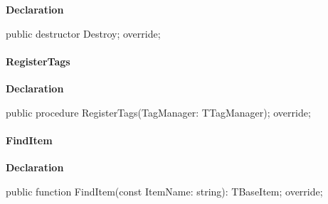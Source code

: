 \documentclass{report}
\newif\ifpdf
\begin{document}
\label{PasDoc_Items.TExternalItem-Destroy}
\begin{list}{}{
\setlength{\itemindent}{0cm}
\setlength{\listparindent}{0cm}
\setlength{\leftmargin}{\evensidemargin}
\addtolength{\leftmargin}{\tmplength}
\settowidth{\labelsep}{X}
\addtolength{\leftmargin}{\labelsep}
\setlength{\labelwidth}{\tmplength}
}
\item[\textbf{Declaration}\hfill]
\ifpdf
\begin{flushleft}
\fi
\begin{ttfamily}
public destructor Destroy; override;\end{ttfamily}

\ifpdf
\end{flushleft}
\fi

\end{list}
\paragraph*{RegisterTags}\hspace*{\fill}

\label{PasDoc_Items.TExternalItem-RegisterTags}
\begin{list}{}{
\setlength{\itemindent}{0cm}
\setlength{\listparindent}{0cm}
\setlength{\leftmargin}{\evensidemargin}
\addtolength{\leftmargin}{\tmplength}
\settowidth{\labelsep}{X}
\addtolength{\leftmargin}{\labelsep}
\setlength{\labelwidth}{\tmplength}
}
\item[\textbf{Declaration}\hfill]
\ifpdf
\begin{flushleft}
\fi
\begin{ttfamily}
public procedure RegisterTags(TagManager: TTagManager); override;\end{ttfamily}

\ifpdf
\end{flushleft}
\fi

\end{list}
\paragraph*{FindItem}\hspace*{\fill}

\label{PasDoc_Items.TExternalItem-FindItem}
\begin{list}{}{
\setlength{\itemindent}{0cm}
\setlength{\listparindent}{0cm}
\setlength{\leftmargin}{\evensidemargin}
\addtolength{\leftmargin}{\tmplength}
\settowidth{\labelsep}{X}
\addtolength{\leftmargin}{\labelsep}
\setlength{\labelwidth}{\tmplength}
}
\item[\textbf{Declaration}\hfill]
\ifpdf
\begin{flushleft}
\fi
\begin{ttfamily}
public function FindItem(const ItemName: string): TBaseItem; override;\end{ttfamily}

\ifpdf
\end{flushleft}
\fi

\end{list}
\end{document}
